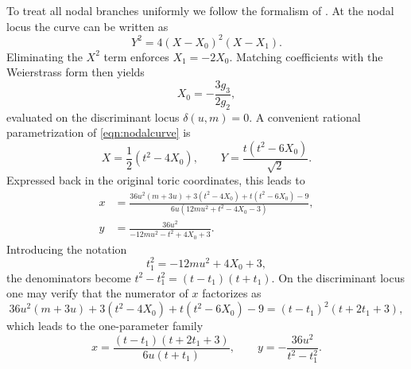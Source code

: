 \documentclass[11pt, a4paper]{article}
\numberwithin{equation}{section}
\begin{document}
To treat all nodal branches uniformly we follow the formalism of \cite{Marino:LocalF1Notes}. At the nodal locus the curve can be written as
\begin{equation}\label{eqn:nodalcurve}
  Y^2 = 4 (X - X_0)^2 (X - X_1).
\end{equation}
Eliminating the $X^2$ term enforces $X_1 = -2 X_0$. Matching coefficients with the Weierstrass form then yields
\begin{equation}
  X_0 = -\frac{3 g_3}{2 g_2},
\end{equation}
evaluated on the discriminant locus $\delta(u,m)=0$. A convenient rational parametrization of \cref{eqn:nodalcurve} is
\begin{equation}\label{eqn:nodalcurveparamorig}
  X = \frac{1}{2}\left(t^2 - 4 X_0\right),
  \qquad
  Y = \frac{t\left(t^2 - 6 X_0\right)}{\sqrt{2}}.
\end{equation}
Expressed back in the original toric coordinates, this leads to
\begin{equation}
\begin{aligned}
  x &= \frac{36 u^2 (m+3 u)+3 (t^2 - 4 X_0) + t(t^2 - 6 X_0) - 9}{6 u \left(12 m u^2 + t^2 - 4 X_0 - 3\right)}, \\
  y &= \frac{36 u^2}{-12 m u^2 - t^2 + 4 X_0 + 3}.
\end{aligned}
\end{equation}
Introducing the notation
\begin{equation}
  t_1^2 = -12 m u^2 + 4 X_0 + 3,
\end{equation}
the denominators become $t^2 - t_1^2 = (t - t_1)(t + t_1)$. On the discriminant locus one may verify that the numerator of $x$ factorizes as
\begin{equation}
  36 u^2 (m+3 u)+3(t^2 - 4 X_0) + t(t^2 - 6 X_0) - 9 
  = (t - t_1)^2 (t + 2 t_1 + 3),
\end{equation}
which leads to the one-parameter family
\begin{equation}\label{eqn:tparam}
  x = \frac{(t - t_1)(t + 2 t_1 + 3)}{6 u (t + t_1)},
  \qquad
  y = -\frac{36 u^2}{t^2 - t_1^2}.
\end{equation}
\end{document}
